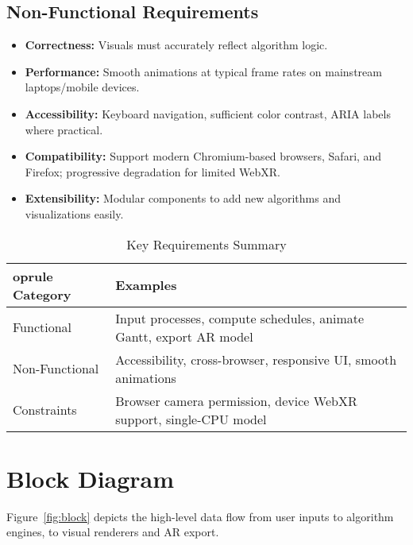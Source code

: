 \documentclass[12pt,a4paper,oneside]{report}
\begin{document}
\subsection*{Non-Functional Requirements}
\begin{itemize}
  \item \textbf{Correctness:} Visuals must accurately reflect algorithm logic.
  \item \textbf{Performance:} Smooth animations at typical frame rates on mainstream laptops/mobile devices.
  \item \textbf{Accessibility:} Keyboard navigation, sufficient color contrast, ARIA labels where practical.
  \item \textbf{Compatibility:} Support modern Chromium-based browsers, Safari, and Firefox; progressive degradation for limited WebXR.
  \item \textbf{Extensibility:} Modular components to add new algorithms and visualizations easily.
\end{itemize}

\begin{table}[H]
  \centering
  \caption{Key Requirements Summary}
  \begin{tabular}{p{} p{}}
    	oprule
    Category & Examples \\
    \midrule
    Functional & Input processes, compute schedules, animate Gantt, export AR model \\
    Non-Functional & Accessibility, cross-browser, responsive UI, smooth animations \\
    Constraints & Browser camera permission, device WebXR support, single-CPU model \\
    \bottomrule
  \end{tabular}
\end{table}

\section{Block Diagram}
Figure~\ref{fig:block} depicts the high-level data flow from user inputs to algorithm engines, to visual renderers and AR export.
\end{document}
